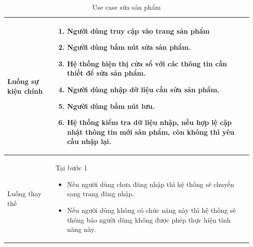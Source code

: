 \documentclass[12pt,a4paper]{article}
\begin{document}
\begin{table}[H]
\begin{tabular}{|p{3.5cm}|p{11.5cm}|c|}
            Luồng sự kiện chính & \vspace{-.8cm}\begin{enumerate}
                                                    \item Người dùng truy cập vào trang sản phẩm
                                                    \item  Người dùng bấm nút sửa sản phẩm.
                                                    \item  Hệ thống hiện thị cửa sổ với các thông tin cần thiết để sửa sản phẩm.
                                                    \item  Người dùng nhập dữ liệu cần sửa sản phẩm.
                                                    \item Người dùng bấm nút lưu.
                                                    \item Hệ thống kiểm tra dữ liệu nhập, nếu hợp lệ cập nhật thông tin mới sản phẩm, còn không thì yêu cầu nhập lại.
            \end{enumerate}
            \\
            \hline
            Luồng thay thế & Tại bước 1\newline
            \vspace{-.8cm}\begin{itemize}
                              \item Nếu người dùng chưa đăng nhập thì hệ thống sẽ chuyển sang trang đăng nhập.
                              \item  Nếu người dùng không có chức năng này thì hệ thống sẽ thông báo người dùng không được phép thực hiện tính năng này.
            \end{itemize}
            \\
            \hline
        \end{tabular}
        \caption{Use case sửa sản phẩm }
    \end{table}


\end{document}
